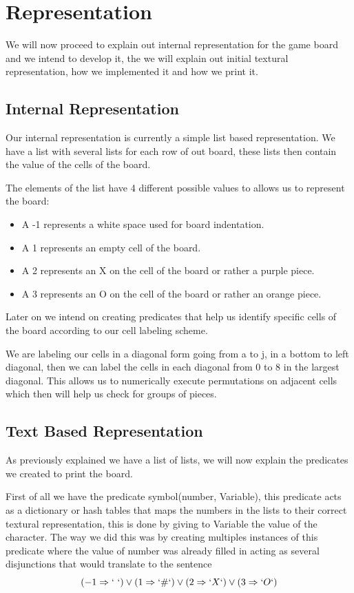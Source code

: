 \documentclass[12pt]{article}
\begin{document}
\pagebreak
\section{Representation}

\hspace{0.6cm}
We will now proceed to explain out internal representation for the game board
and we intend to develop it, the we will explain out initial textural representation,
how we implemented it and how we print it.
\subsection{Internal Representation}
\hspace{0.6cm}
Our internal representation is currently a simple list based representation. We
have a list with several lists for each row of out board, these lists then contain
the value of the cells of the board.

The elements of the list have 4 different possible values to allows us to
represent the board:
\begin{itemize}
  \item A -1 represents a white space used for board indentation.
  \item A 1 represents an empty cell of the board.
  \item A 2 represents an X on the cell of the board or rather a purple piece.
  \item A 3 represents an O on the cell of the board or rather an orange piece.
\end{itemize}

Later on we intend on creating predicates that help us identify specific cells of
the board according to our cell labeling scheme.

We are labeling our cells in a diagonal form going from a to j, in a bottom to left
diagonal, then we can label the cells in each diagonal from 0 to 8 in the largest
diagonal. This allows us to numerically execute permutations on adjacent cells
which then will help us check for groups of pieces.

\subsection{Text Based Representation}
\hspace{0.6cm}
As previously explained we have a list of lists, we will now explain the predicates
we created to print the board.

First of all we have the predicate symbol(number, Variable), this predicate acts as
a dictionary or hash tables that maps the numbers in the lists to their correct textural
representation, this is done by giving to Variable the value of the character. The
way we did this was by creating multiples instances of this predicate where the value
of number was already filled in acting as several disjunctions that would translate to the sentence
 $$(-1 \Rightarrow ` \ `)  \vee (1 \Rightarrow `\#`) \vee (2 \Rightarrow `X`)
\vee (3 \Rightarrow `O`) $$
\end{document}
